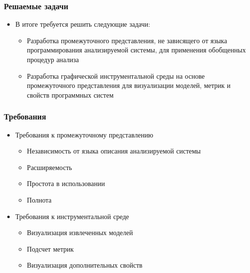 \documentclass{beamer}
\begin{document}
\begin{frame}
\frametitle{Решаемые задачи}

\begin{itemize}
    \item В итоге требуется решить следующие задачи:
        \begin{itemize}
            \item Разработка промежуточного представления, не зависящего от
            языка программирования анализируемой системы, для применения
            обобщенных процедур анализа
            \item Разработка графической инструментальной среды на основе
            промежуточного представления для визуализации моделей, метрик и
            свойств программных систем
        \end{itemize}

\end{itemize}

\end{frame}
\begin{frame}
\frametitle{Требования}

\begin{itemize}
    \item Требования к промежуточному представлению
        \begin{itemize}
            \item Независимость от языка описания анализируемой системы
            \item Расширяемость
            \item Простота в использовании
            \item Полнота
        \end{itemize}
    \item Требования к инструментальной среде
        \begin{itemize}
            \item Визуализация извлеченных моделей
            \item Подсчет метрик
            \item Визуализация дополнительных свойств
        \end{itemize}
\end{itemize}

\end{frame}
\end{document}
